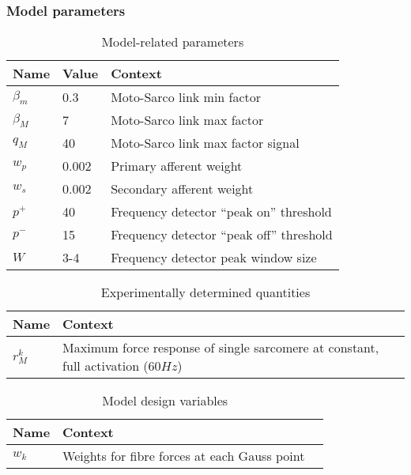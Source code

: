 \subsubsection{Model parameters}
\begin{table}[!ht]
	\begin{tabular}{l|l|l}
		Name & Value & Context\\\hline
		$\beta_m$ & 0.3 & Moto-Sarco link min factor\\
		$\beta_M$ & 7 & Moto-Sarco link max factor\\
		$q_M$ & 40 & Moto-Sarco link max factor signal\\
		$w_p$ & 0.002 & Primary afferent weight\\
		$w_s$ & 0.002 & Secondary afferent weight\\
		$p^+$ & 40 & Frequency detector ``peak on'' threshold\\
		$p^-$ & 15 & Frequency detector ``peak off'' threshold\\
		$W$ & 3-4 & Frequency detector peak window size
	\end{tabular}
	\caption{Model-related parameters}\label{tab:params}
\end{table}
\begin{table}[!ht]
	\begin{tabular}{l|ll}
		Name & Context\\\hline
		$r^k_M$ & Maximum force response of single sarcomere at constant, full activation ($60Hz$) 
	\end{tabular}
	\caption{Experimentally determined quantities}\label{tab:params}
\end{table}
\begin{table}[!ht]
	\begin{tabular}{l|ll}
		Name &  Context\\\hline
		$w_k$ & Weights for fibre forces at each Gauss point  
	\end{tabular}
	\caption{Model design variables}\label{tab:params}
\end{table}
